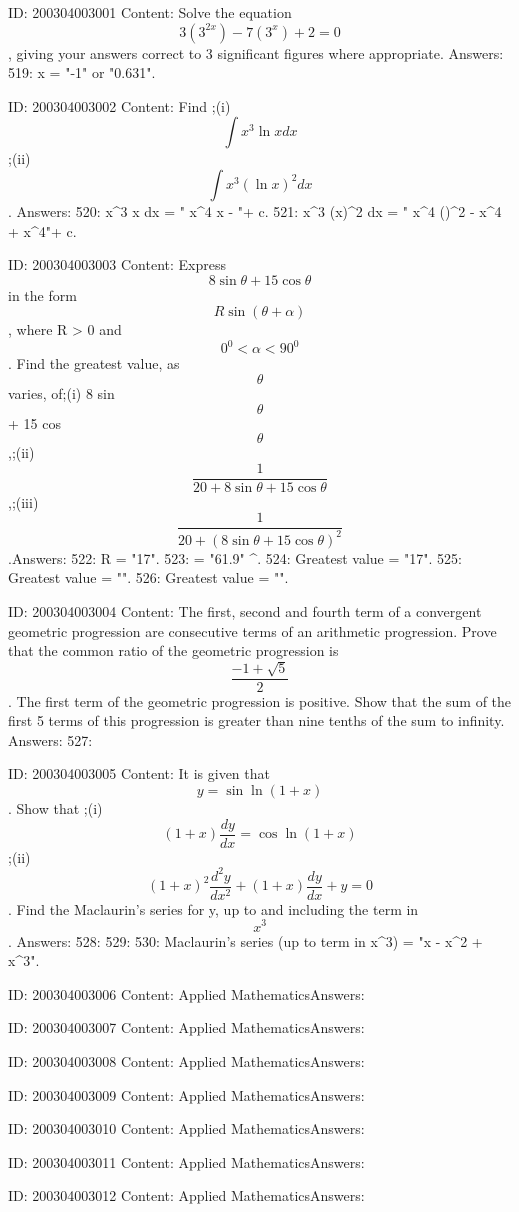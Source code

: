 \documentclass{article}
\begin{document}
ID: 200304003001
Content:
Solve the equation  $$3( 3^{2x} ) - 7( 3^x ) + 2 = 0$$, giving your answers correct to 3 significant figures where appropriate. Answers:
519: x = "-1" or "0.631".

ID: 200304003002
Content:
Find ;(i) $$\int x^3 \ln xdx $$ ;(ii)  $$\int x^3 ( \ln x )^2 dx $$. Answers:
520: \int x^3 \ln x dx = " x^4 x - "+ c.
521: \int x^3 (\ln x)^2 dx = " x^4 ()^2 -  x^4  +  x^4"+ c.

ID: 200304003003
Content:
Express  $$8\sin \theta  + 15\cos \theta $$ in the form  $$R\sin ( \theta  + \alpha  )$$, where R > 0 and  $$0^0  < \alpha  < 90^0 $$. Find the greatest value, as  $$\theta $$ varies, of;(i) 8 sin  $$\theta $$ + 15 cos  $$\theta $$,;(ii) $$\frac{1}{20 + 8\sin \theta  + 15\cos \theta}$$,;(iii) $$\frac{1}{20 + (8\sin \theta  + 15\cos \theta)^2}$$.Answers:
522: R = "17".
523: \alpha = "61.9" ^{\circ}.
524: Greatest value = "17".
525: Greatest value = "".
526: Greatest value = "".

ID: 200304003004
Content:
The first, second and fourth term of a convergent geometric progression are consecutive terms of an arithmetic progression. Prove that the common ratio of the geometric progression is  $$\frac{-1 + \sqrt 5}{2}$$. The first term of the geometric progression is positive. Show that the sum of the first 5 terms of this progression is greater than nine tenths of the sum to infinity.   Answers:
527: 

ID: 200304003005
Content:
It is given that $$y = \sin{\ln (1 + x)}$$. Show that ;(i) $$( 1 + x )\frac{dy}{dx}= \cos {\ln ( 1 + x )}$$;(ii) $$( 1 + x )^2 \frac{d^2 y}{dx^2} + (1 + x)\frac{dy}{dx} + y = 0$$. Find the Maclaurin's series for y, up to and including the term in  $$x^3 $$.  Answers:
528: 
529: 
530: Maclaurin's series (up to term in x^3) = "x - x^2 + x^3".

ID: 200304003006
Content:
Applied MathematicsAnswers:

ID: 200304003007
Content:
Applied MathematicsAnswers:

ID: 200304003008
Content:
Applied MathematicsAnswers:

ID: 200304003009
Content:
Applied MathematicsAnswers:

ID: 200304003010
Content:
Applied MathematicsAnswers:

ID: 200304003011
Content:
Applied MathematicsAnswers:

ID: 200304003012
Content:
Applied MathematicsAnswers:
\end{document}
